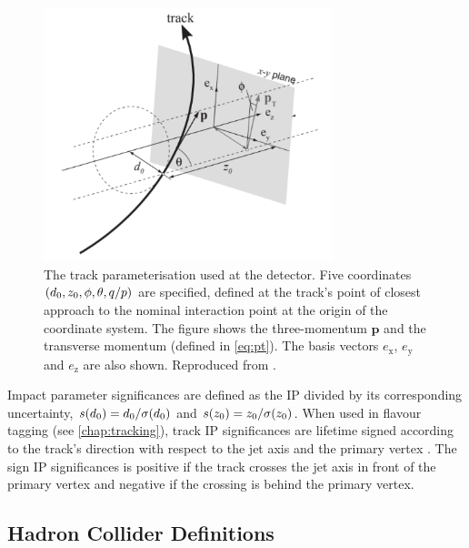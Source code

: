 \begin{figure}[!htbp]
  \centering
  \includegraphics[width=0.75\textwidth]{chapters/2.detector/figs/track_params.pdf}
  \caption{
    The track parameterisation used at the \ATLAS detector.
    Five coordinates $(d_{0}, z_{0}, \phi, \theta, q/p)$ are specified, defined at the track's point of closest approach to the nominal interaction point at the origin of the coordinate system.
    The figure shows the three-momentum $\mathbf{p}$ and the transverse momentum \pt (defined in \cref{eq:pt}).
    The basis vectors $e_{\mathrm{x}}$, $e_{\mathrm{y}}$ and $e_{\mathrm{z}}$ are also shown.
    Reproduced from .
  }
  \label{fig:track_params}
\end{figure}

Impact parameter significances are defined as the IP divided by its corresponding uncertainty, $s(d_0) = d_0 / \sigma(d_0)$ and $s(z_0) = z_0 / \sigma(z_0)$.
When used in flavour tagging (see \cref{chap:tracking}), track IP significances are lifetime signed according to the track's direction with respect to the jet axis and the primary vertex \cite{PERF-2012-04}.
The sign IP significances is positive if the track crosses the jet axis in front of the primary vertex and negative if the crossing is behind the primary vertex.


\subsection{Hadron Collider Definitions}\label{sec:collider_defs}

